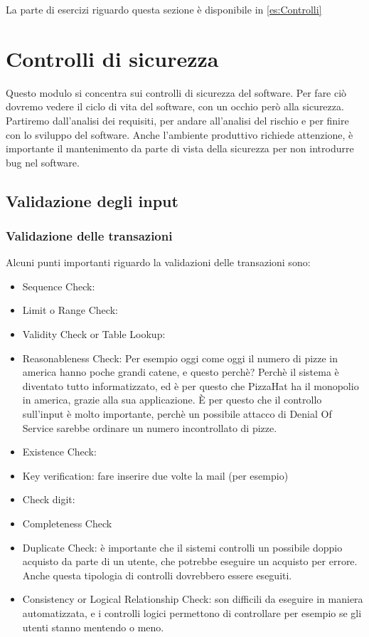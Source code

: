 La parte di esercizi riguardo questa sezione è disponibile in \ref{es:Controlli}

\part{Controlli di sicurezza}

Questo modulo si concentra sui controlli di sicurezza del software. Per fare ciò 
dovremo vedere il ciclo di vita del software, con un occhio però alla sicurezza.
Partiremo dall'analisi dei requisiti, per andare all'analisi del rischio e per 
finire con lo sviluppo del software.
Anche l'ambiente produttivo richiede attenzione, è importante il mantenimento da 
parte di vista della sicurezza per non introdurre bug nel software.

\chapter{Validazione degli input}

\section{Validazione delle transazioni}

Alcuni punti importanti riguardo la validazioni delle transazioni sono:
\begin{itemize}
\item Sequence Check:
\item Limit o Range Check:
\item Validity Check or Table Lookup:
\item Reasonableness Check: 
Per esempio oggi come oggi il numero di pizze in america hanno poche grandi 
catene, e questo perchè? Perchè il sistema è diventato tutto informatizzato, ed 
è per questo che PizzaHat ha il monopolio in america, grazie alla sua 
applicazione. È per questo che il controllo sull'input è molto importante, 
perchè un possibile attacco di Denial Of Service sarebbe ordinare un numero 
incontrollato di pizze.
\item Existence Check:
\item Key verification: fare inserire due volte la mail (per esempio)
\item Check digit:
\item Completeness Check
\item Duplicate Check: è importante che il sistemi controlli un possibile doppio 
acquisto da parte di un utente, che potrebbe eseguire un acquisto per errore. 
Anche questa tipologia di controlli dovrebbero essere eseguiti.
\item Consistency or Logical Relationship Check: son difficili da eseguire in 
maniera automatizzata, e i controlli logici permettono di controllare per 
esempio se gli utenti stanno mentendo o meno. 
\end{itemize}
